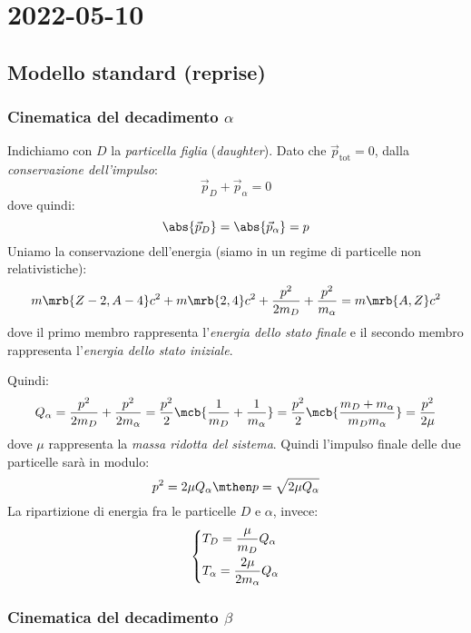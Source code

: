 \chapter{2022-05-10}
\section{Modello standard (reprise)}
\subsection{Cinematica del decadimento $\alpha$}
Indichiamo con $D$ la \textit{particella figlia} (\textit{daughter}).
Dato che $\vec{p}_\text{tot} = 0$, dalla \textit{conservazione dell'impulso}:
\[
  \vec{p}_D + \vec{p}_{\alpha} = 0
\]
dove quindi:
\[
  \abs{\vec{p}_{D}} = \abs{\vec{p}_{\alpha}} = p
\]
Uniamo la conservazione dell'energia (siamo in un regime di particelle non
relativistiche):
\[
  m \mrb{Z-2, A-4} c^2 + m \mrb{2,4} c^2 + \frac{p^2}{2m_D} + \frac{p^2}{m
  _{\alpha}} = m \mrb{A,Z} c^2
\]
dove il primo membro rappresenta l'\textit{energia dello stato finale} e il
secondo membro rappresenta l'\textit{energia dello stato iniziale}.

Quindi:
\[
  Q _{\alpha} = \frac{p^2}{2 m_D} + \frac{p^2}{2 m _{\alpha}} = \frac{p^2}{2}
  \mcb{\frac{1}{m_D} + \frac{1}{m _{\alpha}}} = \frac{p^2}{2} \mcb{\frac{m_D +
  m _{\alpha}}{m_D m _{\alpha}}} = \frac{p^2}{2 \mu}
\]
dove $\mu$ rappresenta la \textit{massa ridotta del sistema}. Quindi l'impulso
finale delle due particelle sarà in modulo:
\[
  p^2 = 2 \mu Q _{\alpha}
  \mthen
  p = \sqrt{2 \mu Q _{\alpha}}
\]
La ripartizione di energia fra le particelle $D$ e $\alpha$, invece:
\[
  \begin{dcases}
    T_D = \frac{\mu}{m_D} Q _{\alpha}
    \\
    T _{\alpha} = \frac{2 \mu}{2 m _{\alpha}} Q _{\alpha}
  \end{dcases}
\]

\subsection{Cinematica del decadimento $\beta$}

